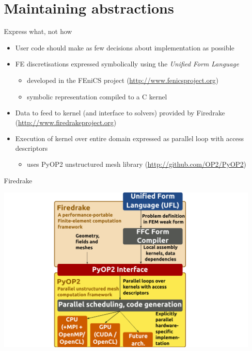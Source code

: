 \documentclass[bigger]{beamer}
\begin{document}
\section{Maintaining abstractions}
\label{sec:orgheadline10}

\begin{frame}[label={sec:orgheadline4}]{Express what, not how}
\begin{itemize}
\item User code should make as few decisions about implementation as
possible
\item FE discretisations expressed symbolically using the \emph{Unified Form Language}
\begin{itemize}
\item developed in the FEniCS project (\url{http://www.fenicsproject.org})
\item symbolic representation compiled to a C kernel
\end{itemize}
\item Data to feed to kernel (and interface to solvers) provided by
Firedrake (\url{http://www.firedrakeproject.org})
\item Execution of kernel over entire domain expressed as parallel loop
with access descriptors
\begin{itemize}
\item uses PyOP2 unstructured mesh library (\url{http://github.com/OP2/PyOP2})
\end{itemize}
\end{itemize}
\end{frame}

\begin{frame}[plain,label={sec:orgheadline5}]{Firedrake}
\begin{center}
\includegraphics[height=1\textheight]{02-22-SIAM-PP-extruded-meshes.figures/firedrake_toolchain}
\end{center}
\end{frame}
\end{document}
